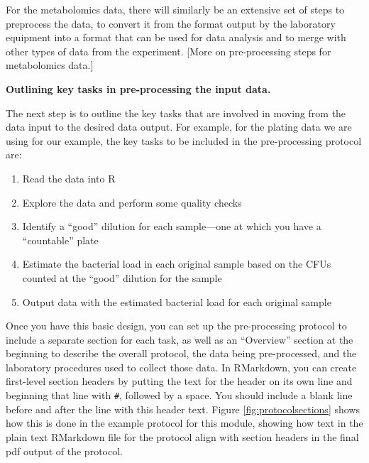 \documentclass[]{tufte-book}
\providecommand{\tightlist}{%
  \setlength{\itemsep}{0pt}\setlength{\parskip}{0pt}}
\begin{document}
For the metabolomics data, there will similarly be an extensive set of steps to
preprocess the data, to convert it from the format output by the laboratory
equipment into a format that can be used for data analysis and to merge with
other types of data from the experiment. {[}More on pre-processing steps for
metabolomics data.{]}

\textbf{Outlining key tasks in pre-processing the input data.}

The next step is to outline the key tasks that are involved in moving from the
data input to the desired data output. For example, for the plating data we are
using for our example, the key tasks to be included in the pre-processing
protocol are:

\begin{enumerate}
\def\labelenumi{\arabic{enumi}.}
\tightlist
\item
  Read the data into R
\item
  Explore the data and perform some quality checks
\item
  Identify a ``good'' dilution for each sample---one at which you have a ``countable'' plate
\item
  Estimate the bacterial load in each original sample based on the CFUs counted
  at the ``good'' dilution for the sample
\item
  Output data with the estimated bacterial load for each original sample
\end{enumerate}

Once you have this basic design, you can set up the pre-processing protocol to
include a separate section for each task, as well as an ``Overview'' section at
the beginning to describe the overall protocol, the data being pre-processed,
and the laboratory procedures used to collect those data. In RMarkdown, you can
create first-level section headers by putting the text for the header on its own
line and beginning that line with \texttt{\#}, followed by a space. You should include a
blank line before and after the line with this header text. Figure
\ref{fig:protocolsections} shows how this is done in the example protocol for
this module, showing how text in the plain text RMarkdown file for the protocol
align with section headers in the final pdf output of the protocol.
\end{document}
